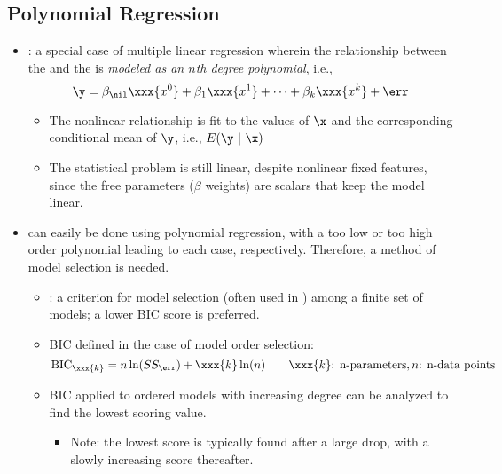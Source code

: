 \begin{itemize}
  \subsection{Polynomial Regression}
  \begin{itemize}
    \item {}: a special case of multiple linear regression wherein the relationship between the  and the  is \emph{modeled as an \(n\)th degree polynomial}, i.e.,
    \[%
    \y = \beta_\nil \xxx{x^0} + \beta_1 \xxx{x^1} + \cdots + \beta_k \xxx{x^k} + \err
    \]%
      \begin{itemize}
        \item The nonlinear relationship is fit to the values of \(\x\) and the corresponding conditional mean of \(\y\), i.e., \(E(\y~|~\x)\)
        \item The statistical problem is still linear, despite nonlinear fixed features, since the free parameters (\(\beta \) weights) are scalars that keep the model linear. 
      \end{itemize}
      \item \hyperref[Subsection: Nested Models]{} can easily be done using polynomial regression, with a too low or too high order polynomial leading to each case, respectively. Therefore, a method of model selection is needed.
        \begin{itemize}
          \item {}: a criterion for model selection (often used in \hyperref[Subsection: Primer: Cross-Validation]{}) among a finite set of models; a lower BIC score is preferred.
          \item BIC defined in the case of model order selection:
          \[%
          \operatorname{BIC}_\xxx{k} = n \ln(SS_\err) + \xxx{k}\ln(n) \qquad \xxx{k}\text{: n-parameters}, n\text{: n-data points}
          \]%
          \item BIC applied to ordered models with increasing degree can be analyzed to find the lowest scoring value.
            \begin{itemize}
              \item Note: the lowest score is typically found after a large drop, with a slowly increasing score thereafter.
            \end{itemize}
        \end{itemize}
  \end{itemize}
  

\end{itemize}
